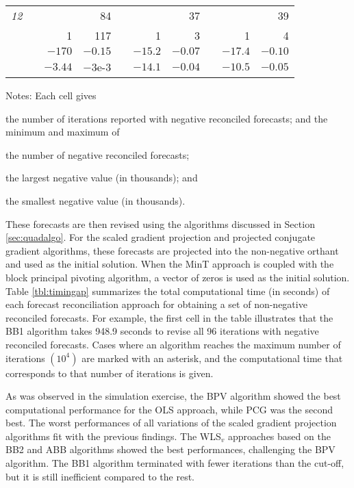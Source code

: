 \documentclass[11pt]{article}
\newcommand{\0}{\phantom{0}}
\begin{document}
\begin{table}[ht]
\begin{threeparttable}
\begin{tabular}{lrrrrrrrrr}
			{\it 12} & & & 84 & & & 37 & & & 39 \\
			& & 1 & 117 & & 1 & 3 & & 1 & 4 \\
			& & $-170$ & $-0.15$ & & $-15.2$ & $-0.07$ & & $-17.4$ & $-0.10$ \\
			& & $-3.44$ & $-3$e-3 & & $-14.1$ & $-0.04$ & & $-10.5$ & $-0.05$ \\
			\bottomrule
		\end{tabular}
		\begin{tablenotes}
			\item [] Notes: Each cell gives \begin{inparaenum}[(i)] \item the number of iterations reported with negative reconciled forecasts; and the minimum and maximum of \item the number of negative reconciled forecasts; \item the largest negative value (in thousands); and \item the smallest negative value (in thousands). \end{inparaenum}
		\end{tablenotes}
	\end{threeparttable}
\end{table}

These forecasts are then revised using the algorithms discussed in Section \ref{sec:quadalgo}. For the scaled gradient projection and projected conjugate gradient algorithms, these forecasts are projected into the non-negative orthant and used as the initial solution. When the MinT approach is coupled with the block principal pivoting algorithm, a vector of zeros is used as the initial solution. Table \ref{tbl:timingap} summarizes the total computational time (in seconds) of each forecast reconciliation approach for obtaining a set of non-negative reconciled forecasts. For example, the first cell in the table illustrates that the BB1 algorithm takes 948.9 seconds to revise all 96 iterations with negative reconciled forecasts. Cases where an algorithm reaches the maximum number of iterations $(10^{4})$ are marked with an asterisk, and the computational time that corresponds to that number of iterations is given.

As was observed in the simulation exercise, the BPV algorithm showed the best computational performance for the OLS approach, while PCG was the second best. The worst performances of all variations of the scaled gradient projection algorithms fit with the previous findings. The WLS$_{v}$ approaches based on the BB2 and ABB algorithms showed the best performances, challenging the BPV algorithm. The BB1 algorithm terminated with fewer iterations than the cut-off, but it is still inefficient compared to the rest. 
\end{document}
